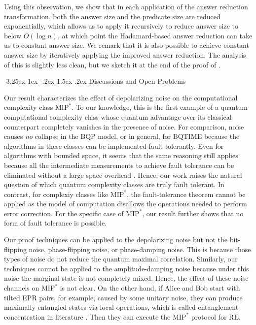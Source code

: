 \documentclass[10pt,a4paper]{article}
\makeatletter
\renewcommand{\subsection}{\@startsection{subsection}{2}{\z@}%
             {-3.25ex\@plus -1ex \@minus -.2ex}%
             {1.5ex \@plus .2ex}%
             {\normalfont\large\scshape\bfseries}}
\theoremstyle{plain}
\theoremstyle{definition}
\newcommand{\1}{\mathbb{1}} %
\newcommand{\MIP}{\mathrm{MIP}}
\newcommand{\RE}{\mathrm{RE}}
\makeatother
\begin{document}
Using this observation, we show that in each application of the answer reduction transformation, both the answer size and the predicate size are reduced exponentially, which allows us to apply it recursively to reduce answer size to below $O(\log n)$, at which point the Hadamard-based answer reduction can take us to constant answer size. We remark that it is also possible to achieve constant answer size by iteratively applying the improved answer reduction. The analysis of this is slightly less clean, but we sketch it at the end of the proof of .


\subsection{Discussions and Open Problems}



Our result characterizes the effect of depolarizing noise on the computational complexity class $\MIP^\ast$.
To our knowledge, this is the first example of a quantum computational complexity class whose quantum advantage over its classical counterpart completely vanishes in the presence of noise.
For comparison, noise causes \emph{no} collapse in the $\mathrm{BQP}$ model, or in general, for $\mathrm{BQTIME}$ because the algorithms in these classes can be implemented fault-tolerantly.
Even for algorithms with bounded space, it seems that the same reasoning still applies because all the intermediate measurements to achieve fault tolerance can be eliminated without a large space overhead \cite{fefferman2021eliminating}.
Hence, our work raises the natural question of which quantum complexity classes are truly fault tolerant. 
In contrast, for complexiy classes like $\MIP^*$, the fault-tolerance theorem \cite{aharonov2008fault} cannot be applied as the model of computation disallows the operations needed to perform error correction. For the specific case of $\MIP^*$, our result further shows that no form of fault tolerance is possible. 

Our proof techniques can be applied to the depolarizing noise but not the
bit-flipping noise, phase-flipping noise, or phase-damping noise.
This is because those types of noise do not reduce the quantum maximal correlation. Similarly, our techniques cannot be applied to the amplitude-damping noise because under this noise the marginal state is not completely mixed.
Hence, the effect of these noise channels on $\MIP^*$ is not clear.
On the other hand, if Alice and Bob start with tilted EPR pairs, for example, caused by some unitary noise, they can produce maximally entangled states via local operations, which is called entanglement concentration in literature \cite{bennett1996concentrating}. Then they can execute the $\MIP^*$ protocol for $\RE$.
\end{document}

